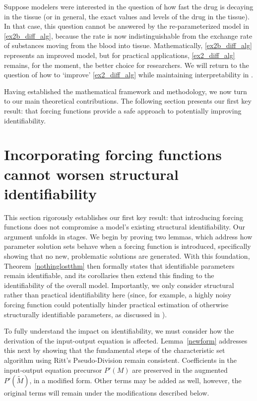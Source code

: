 \documentclass[a4paper,fleqn]{cas-dc}
\theoremstyle{definition}
\begin{document}
Suppose modelers were interested in the question of how fast the drug is decaying in the tissue (or in general, the exact values and levels of the drug in the tissue). In that case, this question cannot be answered by the re-parameterized model in \cref{ex2b_diff_alg}, because the rate is now indistinguishable from the exchange rate of substances moving from the blood into tissue.
Mathematically, \cref{ex2b_diff_alg} represents an improved model, but for practical applications, \cref{ex2_diff_alg} remains, for the moment, the better choice for researchers.
We will return to the question of how to `improve' \cref{ex2_diff_alg} while maintaining interpretability in .

\vspace{0.2cm}

\noindent Having established the mathematical framework and methodology, we now turn to our main theoretical contributions. The following section presents our first key result: that forcing functions provide a safe approach to potentially improving identifiability.


\section{Incorporating forcing functions cannot worsen structural identifiability} \label{s:incorp}

\noindent This section rigorously establishes our first key result: that introducing forcing functions does not compromise a model's existing structural identifiability. Our argument unfolds in stages. We begin by proving two lemmas, which address how parameter solution sets behave when a forcing function is introduced, specifically showing that no new, problematic solutions are generated. With this foundation, Theorem~\ref{nothinglostthm} then formally states that identifiable parameters remain identifiable, and its corollaries then extend this finding to the identifiability of the overall model. Importantly, we only consider structural rather than practical identifiability here (since, for example, a highly noisy forcing function could potentially hinder practical estimation of otherwise structurally identifiable parameters, as discussed in \cite{murphy2024measurement}).

To fully understand the impact on identifiability, we must consider how the derivation of the input-output equation is affected. Lemma~\ref{newform} addresses this next by showing that the fundamental steps of the characteristic set algorithm using Ritt's Pseudo-Division remain consistent. Coefficients in the input-output equation precursor $P'(M)$ are preserved in the augmented $P'(\tilde{M})$, in a modified form. Other terms may be added as well, however, the original terms will remain under the modifications described below.
\end{document}
